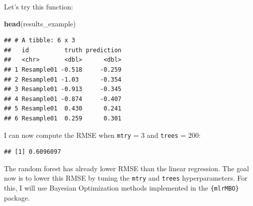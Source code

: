 \documentclass[]{gitbook}
\newenvironment{Shaded}{\begin{snugshade}}{\end{snugshade}}
\newcommand{\DataTypeTok}[1]{\textcolor[rgb]{0.13,0.29,0.53}{#1}}
\newcommand{\DecValTok}[1]{\textcolor[rgb]{0.00,0.00,0.81}{#1}}
\newcommand{\KeywordTok}[1]{\textcolor[rgb]{0.13,0.29,0.53}{\textbf{#1}}}
\newcommand{\NormalTok}[1]{#1}
\newcommand{\OperatorTok}[1]{\textcolor[rgb]{0.81,0.36,0.00}{\textbf{#1}}}
\newcommand{\StringTok}[1]{\textcolor[rgb]{0.31,0.60,0.02}{#1}}
\begin{document}
Let's try this function:

\begin{Shaded}
\end{Shaded}

\begin{Shaded}
\begin{Highlighting}[]
\KeywordTok{head}\NormalTok{(results_example)}
\end{Highlighting}
\end{Shaded}

\begin{verbatim}
## # A tibble: 6 x 3
##   id          truth prediction
##   <chr>       <dbl>      <dbl>
## 1 Resample01 -0.518     -0.259
## 2 Resample01 -1.03      -0.354
## 3 Resample01 -0.913     -0.345
## 4 Resample01 -0.874     -0.407
## 5 Resample01  0.430      0.241
## 6 Resample01  0.259      0.301
\end{verbatim}

I can now compute the RMSE when \texttt{mtry} = 3 and \texttt{trees} = 200:

\begin{Shaded}
\end{Shaded}

\begin{verbatim}
## [1] 0.6096097
\end{verbatim}

The random forest has already lower RMSE than the linear regression. The goal now is to lower this
RMSE by tuning the \texttt{mtry} and \texttt{trees} hyperparameters. For this, I will use Bayesian Optimization
methods implemented in the \texttt{\{mlrMBO\}} package.
\end{document}
